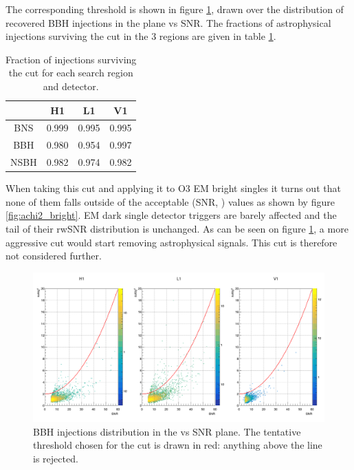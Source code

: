 The corresponding threshold is shown in figure \ref{fig:inj_achi2}, drawn over the distribution of recovered BBH injections in the plane \achi vs SNR.
The fractions of astrophysical injections surviving the cut in the 3 regions are given in table \ref{tab:inj_frac}.
%
\begin{table}[h]
    \centering
    \begin{tabular}{c|c|c|c}
         & H1 & L1 & V1 \\ \hline
         BNS & 0.999 & 0.995 & 0.995 \\
         BBH & 0.980 & 0.954 & 0.997 \\
         NSBH & 0.982 & 0.974 & 0.982 \\
    \end{tabular}
    \caption{Fraction of injections surviving the \achi cut for each search region and detector.}
    \label{tab:inj_frac}
\end{table}
%
When taking this cut and applying it to O3 EM bright singles it turns out that none of them falls outside of the acceptable (SNR, \achi) values as shown by figure \ref{fig:achi2_bright}.
EM dark single detector triggers are barely affected and the tail of their rwSNR distribution is unchanged.
As can be seen on figure \ref{fig:inj_achi2}, a more aggressive cut would start removing astrophysical signals.
This cut is therefore not considered further.

\begin{figure}[hb]
    \centering
    \includegraphics[width=\textwidth]{sectionSelection/plotsOther/cSnrAchi2InjCut_BBH.png}
    \caption{BBH injections distribution in the \achi vs SNR plane. The tentative threshold chosen for the cut is drawn in red: anything above the line is rejected.}
    \label{fig:inj_achi2}
\end{figure}

